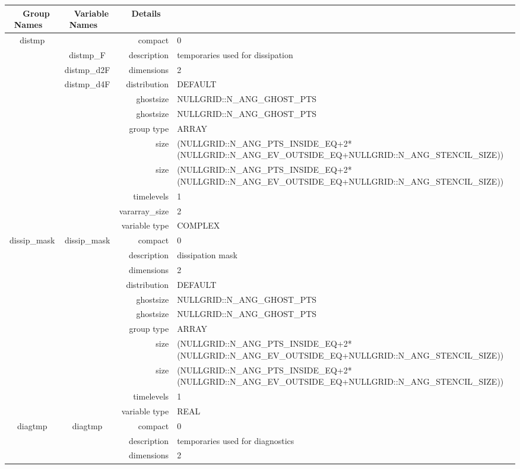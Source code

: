 \begin{tabular*}{150mm}{|c|c@{\extracolsep{\fill}}|rl|} \hline 
~ {\bf Group Names} ~ & ~ {\bf Variable Names} ~  &{\bf Details} ~ & ~\\ 
\hline 
distmp &  & compact & 0 \\ 
 & distmp\_F & description & temporaries used for dissipation \\ 
 & distmp\_d2F & dimensions & 2 \\ 
 & distmp\_d4F & distribution & DEFAULT \\ 
 &  & ghostsize & NULLGRID::N\_ANG\_GHOST\_PTS \\ 
& ~ & ghostsize & NULLGRID::N\_ANG\_GHOST\_PTS \\ 
 &  & group type & ARRAY \\ 
 &  & size & (NULLGRID::N\_ANG\_PTS\_INSIDE\_EQ+2*(NULLGRID::N\_ANG\_EV\_OUTSIDE\_EQ+NULLGRID::N\_ANG\_STENCIL\_SIZE)) \\ 
& ~ & size & (NULLGRID::N\_ANG\_PTS\_INSIDE\_EQ+2*(NULLGRID::N\_ANG\_EV\_OUTSIDE\_EQ+NULLGRID::N\_ANG\_STENCIL\_SIZE)) \\ 
 &  & timelevels & 1 \\ 
 &  & vararray\_size & 2 \\ 
 &  & variable type & COMPLEX \\ 
\hline 
dissip\_mask & dissip\_mask & compact & 0 \\ 
 &  & description & dissipation mask \\ 
 &  & dimensions & 2 \\ 
 &  & distribution & DEFAULT \\ 
 &  & ghostsize & NULLGRID::N\_ANG\_GHOST\_PTS \\ 
& ~ & ghostsize & NULLGRID::N\_ANG\_GHOST\_PTS \\ 
 &  & group type & ARRAY \\ 
 &  & size & (NULLGRID::N\_ANG\_PTS\_INSIDE\_EQ+2*(NULLGRID::N\_ANG\_EV\_OUTSIDE\_EQ+NULLGRID::N\_ANG\_STENCIL\_SIZE)) \\ 
& ~ & size & (NULLGRID::N\_ANG\_PTS\_INSIDE\_EQ+2*(NULLGRID::N\_ANG\_EV\_OUTSIDE\_EQ+NULLGRID::N\_ANG\_STENCIL\_SIZE)) \\ 
 &  & timelevels & 1 \\ 
 &  & variable type & REAL \\ 
\hline 
diagtmp & diagtmp & compact & 0 \\ 
 &  & description & temporaries used for diagnostics \\ 
 &  & dimensions & 2 \\ 

\end{tabular*}
